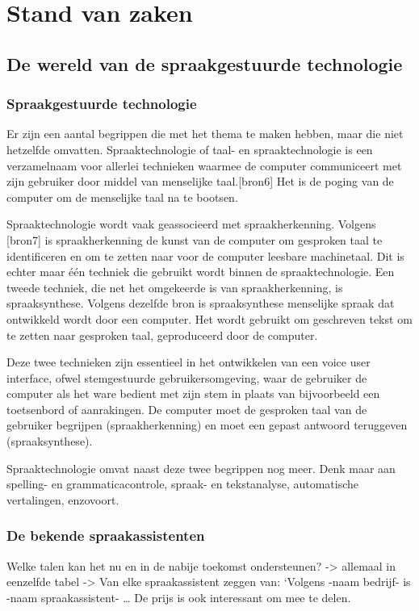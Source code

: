 \chapter{Stand van zaken}
\label{ch:stand-van-zaken}

\section{De wereld van de spraakgestuurde technologie}
\subsection{Spraakgestuurde technologie}
Er zijn een aantal begrippen die met het thema te maken hebben, maar die niet hetzelfde omvatten. Spraaktechnologie of taal- en spraaktechnologie is een verzamelnaam voor allerlei technieken waarmee de computer communiceert met zijn gebruiker door middel van menselijke taal.[bron6] Het is de poging van de computer om de menselijke taal na te bootsen.

Spraaktechnologie wordt vaak geassocieerd met spraakherkenning. Volgens [bron7] is spraakherkenning de kunst van de computer om gesproken taal te identificeren en om te zetten naar voor de computer leesbare machinetaal. Dit is echter maar één techniek die gebruikt wordt binnen de spraaktechnologie. Een tweede techniek, die net het omgekeerde is van spraakherkenning, is spraaksynthese. Volgens dezelfde bron is spraaksynthese menselijke spraak dat ontwikkeld wordt door een computer. Het wordt gebruikt om geschreven tekst om te zetten naar gesproken taal, geproduceerd door de computer.

Deze twee technieken zijn essentieel in het ontwikkelen van een voice user interface, ofwel stemgestuurde gebruikersomgeving, waar de gebruiker de computer als het ware bedient met zijn stem in plaats van bijvoorbeeld een toetsenbord of aanrakingen. De computer moet de gesproken taal van de gebruiker begrijpen (spraakherkenning) en moet een gepast antwoord teruggeven (spraaksynthese).

Spraaktechnologie omvat naast deze twee begrippen nog meer. Denk maar aan spelling- en grammaticacontrole, spraak- en tekstanalyse, automatische vertalingen, enzovoort.


\subsection{De bekende spraakassistenten}
Welke talen kan het nu en in de nabije toekomst ondersteunen?
-> allemaal in eenzelfde tabel
-> Van elke spraakassistent zeggen van: ‘Volgens -naam bedrijf- is -naam spraakassistent- … De prijs is ook interessant om mee te delen.

